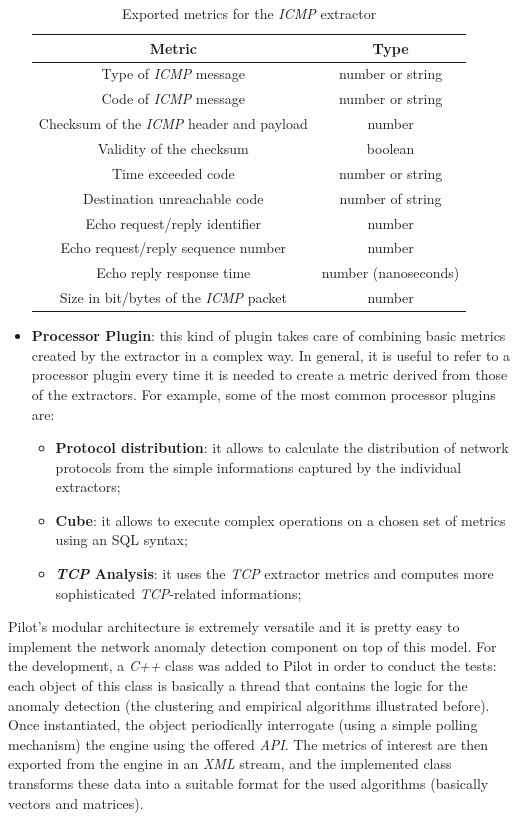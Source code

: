 \documentclass[12pt,a4paper,cucitura]{toptesi}
\begin{document}
\begin{itemize}
\begin{table}
\centering
\begin{tabular}{|c|c|}
\hline
\hline
Metric & Type \\
\hline
Type of \emph{ICMP} message & number or string \\ 
Code of \emph{ICMP} message & number or string \\
Checksum of the \emph{ICMP} header and payload & number \\
Validity of the checksum & boolean \\
Time exceeded code & number or string \\
Destination unreachable code & number of string \\
Echo request/reply identifier & number \\
Echo request/reply sequence number & number \\
Echo reply response time & number (nanoseconds) \\
Size in bit/bytes of the \emph{ICMP} packet & number \\
\hline
\hline
\end{tabular}
\caption{Exported metrics for the \emph{ICMP} extractor}
\end{table}
\item \textbf{Processor Plugin}: this kind of plugin takes care of combining basic metrics created by the extractor in a complex way. In general, it is useful to refer to a processor plugin every time it is needed to create a metric derived from those of the extractors. For example, some of the most common processor plugins are:
\begin{itemize}
\item \textbf{Protocol distribution}: it allows to calculate the distribution of network protocols from the simple informations captured by the individual extractors;
\item \textbf{Cube}: it allows to execute complex operations on a chosen set of metrics using an SQL syntax;
\item \textbf{\emph{TCP} Analysis}: it uses the \emph{TCP} extractor metrics and computes more sophisticated \emph{TCP}-related informations;
\end{itemize}
\end{itemize}

Pilot's modular architecture is extremely versatile and it is pretty easy to implement the network anomaly detection component on top of this model. For the development, a \emph{C++} class was added to Pilot in order to conduct the tests: each object of this class is basically a thread that contains the logic for the anomaly detection (the clustering and empirical algorithms illustrated before). 
Once instantiated, the object periodically interrogate (using a simple polling mechanism) the engine using the offered \emph{API}.
The metrics of interest are then exported from the engine in an \emph{XML} stream, and the implemented class transforms these data into a suitable format for the used algorithms (basically vectors and matrices).
\end{document}
